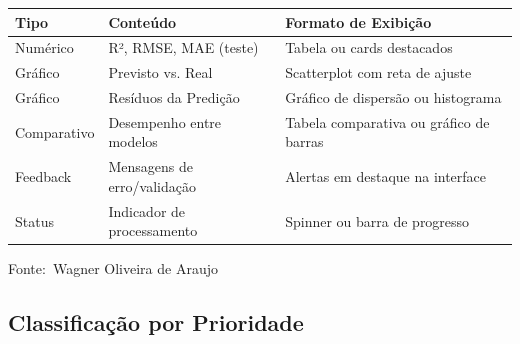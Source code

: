 \documentclass[12pt,a4paper]{article}
\newcommand{\oautor}{Wagner Oliveira de Araujo}
\begin{document}
\begin{quadro}[ht]
\begin{center}
\small
\caption{Saídas esperadas do sistema}
\label{quadro:saidas}
\begin{threeparttable}
\begin{tabularx}{\textwidth}{|l|l|X|} \hline
\textbf{Tipo} & \textbf{Conteúdo} & \textbf{Formato de Exibição} \\ \hline
Numérico & R², RMSE, MAE (teste) & Tabela ou cards destacados \\ \hline
Gráfico & Previsto vs. Real & Scatterplot com reta de ajuste \\ \hline
Gráfico & Resíduos da Predição & Gráfico de dispersão ou histograma \\ \hline
Comparativo & Desempenho entre modelos & Tabela comparativa ou gráfico de barras \\ \hline
Feedback & Mensagens de erro/validação & Alertas em destaque na interface \\ \hline
Status & Indicador de processamento & Spinner ou barra de progresso \\ \hline
\end{tabularx}
\begin{tablenotes}[flushleft]
\footnotesize
\item Fonte:~\oautor
\end{tablenotes}
\end{threeparttable}
\end{center}
\end{quadro}

\subsection{Classificação por Prioridade}
\end{document}
